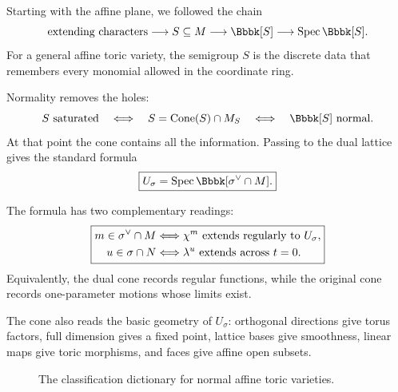 Starting with the affine plane, we followed the chain
\[
\text{extending characters}
\longrightarrow
S\subseteq M
\longrightarrow
\Bbbk[S]
\longrightarrow
\Spec\Bbbk[S].
\]
For a general affine toric variety, the semigroup \(S\) is the
discrete data that remembers every monomial allowed in the coordinate
ring.

Normality removes the holes:
\[
S\text{ saturated}
\quad\Longleftrightarrow\quad
S=\Cone{S}\cap M_S
\quad\Longleftrightarrow\quad
\Bbbk[S]\text{ normal}.
\]
At that point the cone contains all the information. Passing to the
dual lattice gives the standard formula
\[
\boxed{
U_\sigma
=
\Spec\Bbbk[\sigma^\vee\cap M].
}
\]

The formula has two complementary readings:
\[
\boxed{
\begin{aligned}
m\in\sigma^\vee\cap M
&\Longleftrightarrow
\chi^{m}\text{ extends regularly to }U_\sigma,\\
u\in\sigma\cap N
&\Longleftrightarrow
\lambda^{u}\text{ extends across }t=0.
\end{aligned}
}
\]
Equivalently, the dual cone records regular functions, while the
original cone records one-parameter motions whose limits exist.

The cone also reads the basic geometry of \(U_\sigma\): orthogonal
directions give torus factors, full dimension gives a fixed point,
lattice bases give smoothness, linear maps give toric morphisms, and
faces give affine open subsets.

\begin{figure}[ht]
\centering
{}
\caption{The classification dictionary for normal affine toric
varieties.}
\label{fig:affine-toric-classification-dictionary}
\end{figure}

